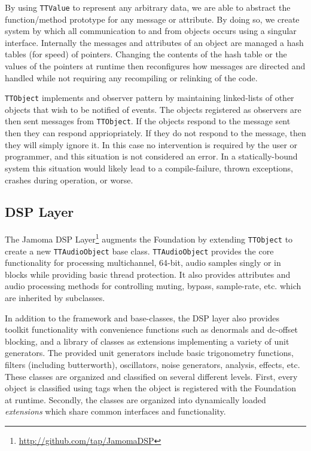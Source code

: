 \documentclass[twoside,10pt]{article}
\begin{document}
By using \texttt{TTValue} to represent any arbitrary data, we are able to abstract the function/method prototype for any message or attribute.  By doing so, we create system by which all communication to and from objects occurs using a singular interface.  Internally the messages and attributes of an object are managed a hash tables (for speed) of pointers.  Changing the contents of the hash table or the values of the pointers at runtime then reconfigures how messages are directed and handled while not requiring any recompiling or relinking of the code.

\texttt{TTObject} implements and observer pattern by maintaining linked-lists of other objects that wish to be notified of events.  The objects registered as observers are then sent messages from \texttt{TTObject}.  If the objects respond to the message sent then they can respond appriopriately.  If they do not respond to the message, then they will simply ignore it.  In this case no intervention is required by the user or programmer, and this situation is not considered an error.  In a statically-bound system this situation would likely lead to a compile-failure, thrown exceptions, crashes during operation, or worse.



\subsection{DSP Layer} %

The Jamoma DSP Layer\footnote{\url{http://github.com/tap/JamomaDSP}} augments the Foundation by extending \texttt{TTObject} to create a new \texttt{TTAudioObject} base class.  \texttt{TTAudioObject} provides the core functionality for processing multichannel, 64-bit, audio samples singly or in blocks while providing basic thread protection.  It also provides attributes and audio processing methods for controlling muting, bypass, sample-rate, etc. which are inherited by subclasses.

In addition to the framework and base-classes, the DSP layer also provides toolkit functionality with convenience functions such as denormals and dc-offset blocking, and a library of classes as extensions implementing a variety of unit generators.  The provided unit generators include basic trigonometry functions, filters (including butterworth), oscillators, noise generators, analysis, effects, etc.  These classes are organized and classified on several different levels.  First, every object is classified using tags when the object is registered with the Foundation at runtime.  Secondly, the classes are organized into dynamically loaded \emph{extensions} which share common interfaces and functionality.
\end{document}
